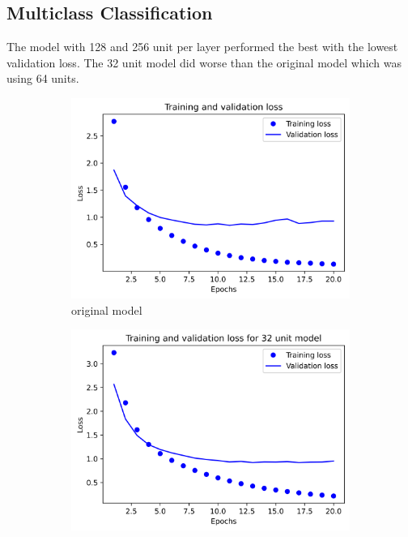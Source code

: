 \documentclass{article}
\begin{document}
    \subsection{Multiclass Classification}
    The model with 128 and 256 unit per layer performed the best with the lowest validation 
    loss. The 32 unit model did worse than the original model which was using 64 units.
    \begin{figure}[H]
        \begin{subfigure}{.5\textwidth}
            \centering
            \includegraphics[width=\linewidth]{images/reuters/original.png}
            \caption{original model}
            \label{fig4:sfig1}
        \end{subfigure}
        \begin{subfigure}{.5\textwidth}
            \centering
            \includegraphics[width=\linewidth]{images/reuters/1.png}

\end{subfigure}
\end{figure}
\end{document}
